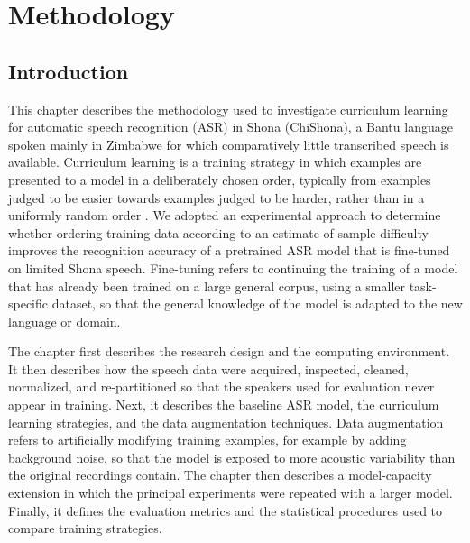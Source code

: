 
\section{Methodology}

\subsection{Introduction}

This chapter describes the methodology used to investigate curriculum learning
for automatic speech recognition (ASR) in Shona (ChiShona), a Bantu language
spoken mainly in Zimbabwe for which comparatively little transcribed speech is
available. Curriculum learning is a training strategy in which examples are
presented to a model in a deliberately chosen order, typically from examples
judged to be easier towards examples judged to be harder, rather than in a
uniformly random order \citep{Bengio2009}. We adopted an experimental approach
to determine whether ordering training data according to an estimate of sample
difficulty improves the recognition accuracy of a pretrained ASR model that is
fine-tuned on limited Shona speech. Fine-tuning refers to continuing the
training of a model that has already been trained on a large general corpus,
using a smaller task-specific dataset, so that the general knowledge of the
model is adapted to the new language or domain.

The chapter first describes the research design and the computing environment.
It then describes how the speech data were acquired, inspected, cleaned,
normalized, and re-partitioned so that the speakers used for evaluation never
appear in training. Next, it describes the baseline ASR model, the curriculum
learning strategies, and the data augmentation techniques. Data augmentation
refers to artificially modifying training examples, for example by adding
background noise, so that the model is exposed to more acoustic variability than
the original recordings contain. The chapter then describes a model-capacity
extension in which the principal experiments were repeated with a larger model.
Finally, it defines the evaluation metrics and the statistical procedures used
to compare training strategies.

